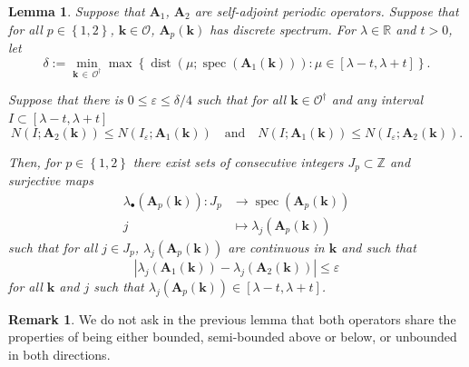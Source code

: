 \documentclass[10pt]{amsart}
\newtheorem{lemm}[theo]{Lemma}\newtheorem{prop}[theo]{Proposition}\newtheorem{coro}[theo]{Corollary}\newtheorem{conj}[theo]{Conjecture}
\theoremstyle{definition}\newtheorem{defi}[theo]{Definition}\newtheorem{rema}[theo]{Remark}\newtheorem{exam}[theo]{Example}\newtheorem{nota}[theo]{Notation}
\DeclareMathOperator{\spec}{spec}
\DeclareMathOperator{\dist}{dist}
\newcommand{\R}{\mathbb R}
\newcommand{\Z}{\mathbb Z}
\newcommand{\CO}{\mathcal{O}}
\newcommand{\BA}{\mathbf A}
\newcommand{\bk}{\mathbf k}
\newcommand{\eps}{\varepsilon}
\newcommand{\set}[1]{\left\{ #1 \right\}}
\begin{document}
\begin{lemm} \label{lem:overlapidscont}
Suppose that $\BA_1$, $\BA_2$ are self-adjoint periodic operators. Suppose that for all $p \in \set{1,2}$, $\bk \in \CO$, $\BA_p(\bk)$ has discrete spectrum. For $\lambda \in \R$ and $t > 0$, let
\begin{equation}\label{eq:smalldist}
\delta := \min_{\bk\,\in\,\CO^\dagger} \max\left\{\dist(\mu;\spec(\BA_1(\bk))) :
\mu \in [\lambda - t, \lambda + t]\right\}.
\end{equation}

Suppose that there is $0 \le \eps \le \delta/4$ such that for all $\bk \in
\CO^\dagger$ and any interval $I \subset [\lambda - t, \lambda + t]$
\begin{equation}\label{eq:condids}
N(I; \BA_2(\bk)) \le N(I_\eps;\BA_1(\bk))
\quad \text{and} \quad N(I;\BA_1(\bk)) \le N(I_\eps;\BA_2(\bk)).
\end{equation}

Then, for $p \in \set{1,2}$ there exist sets of consecutive integers $J_p \subset \Z$ and surjective maps
\[
\begin{aligned}
\lambda_\bullet(\BA_p(\bk)) : J_p &\to \spec(\BA_p(\bk)) \\
j &\mapsto \lambda_j(\BA_p(\bk))
\end{aligned}
\]
such that for all $j \in J_p$, $\lambda_j(\BA_p(\bk))$ are continuous in $\bk$ and such that
\begin{equation}\label{eq:evclose}
\left|\lambda_j(\BA_1(\bk)) - \lambda_j(\BA_2(\bk))\right| \le \eps
\end{equation}
for all $\bk$ and $j$ such that $\lambda_j(\BA_p(\bk)) \in [\lambda-t,\lambda+t]$.
\end{lemm}

\begin{rema}
We do not ask in the previous lemma that both operators share the properties of being either bounded, semi-bounded above or below, or unbounded in both directions.
\end{rema}
\end{document}
